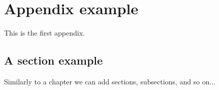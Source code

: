 \chapter{Appendix example}
\label{a1}

This is the first appendix.


\section{A section example}

Similarly to a chapter we can add sections, subsections, and so on...
